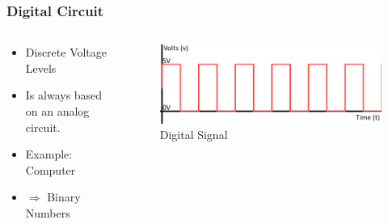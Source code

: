 \documentclass{beamer}
\begin{document}
\begin{frame}\frametitle{Digital Circuit}
  \begin{columns}
  \begin{column}{6cm}
  \begin{itemize}
   \item Discrete Voltage Levels
   \item Is always based on an analog circuit.
   \item Example: Computer
   \item $\Rightarrow$ Binary Numbers

  \end{itemize}


  \end{column}
  \begin{column}{6cm}
  \begin{figure}
  \includegraphics[width=1\textwidth]{digital}
  \caption{Digital Signal}
  \end{figure}
  \end{column}
  \end{columns}
\end{frame}
\end{document}
